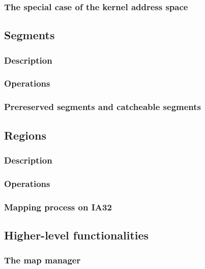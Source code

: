 
\begin{frame}
  \frametitle{The special case of the kernel address space}

\end{frame}

%
%

\subsection{Segments}


\begin{frame}
  \frametitle{Description}
\end{frame}


\begin{frame}
  \frametitle{Operations}
\end{frame}


\begin{frame}
  \frametitle{Prereserved segments and catcheable segments}
\end{frame}

%
%

\subsection{Regions}


\begin{frame}
  \frametitle{Description}
\end{frame}


\begin{frame}
  \frametitle{Operations}
\end{frame}


\begin{frame}
  \frametitle{Mapping process on IA32}
\end{frame}

%
%

\subsection{Higher-level functionalities}


\begin{frame}
  \frametitle{The map manager}
\end{frame}

